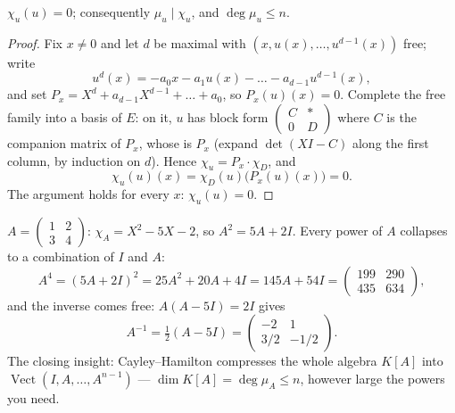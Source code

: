 \begin{theorem}\label{thm:b2:reduction:cayleyhamilton}
$\chi_u(u) = 0$; consequently $\mu_u \mid \chi_u$, and $\deg \mu_u
\leq n$.
\end{theorem}

\begin{proof}
Fix $x \neq 0$ and let $d$ be maximal with $(x, u(x), \dots,
u^{d-1}(x))$ free; write
\[
u^d(x) = -a_0 x - a_1 u(x) - \dots - a_{d-1}u^{d-1}(x),
\]
and set $P_x = X^d + a_{d-1}X^{d-1} + \dots + a_0$, so $P_x(u)(x) =
0$. Complete the free family into a basis of $E$: on it, $u$ has
block form $\begin{pmatrix} C & \ast\\ 0 & D\end{pmatrix}$ where $C$
is the companion matrix of $P_x$, whose  is
$P_x$ (expand $\det(XI - C)$ along the first column, by induction on
$d$). Hence $\chi_u = P_x \cdot \chi_D$, and
\[
\chi_u(u)(x) = \chi_D(u)\bigl(P_x(u)(x)\bigr) = 0 .
\]
The argument holds for every $x$: $\chi_u(u) = 0$.
\end{proof}

\begin{example}\label{ex:b2:reduction:chwork}
$A = \begin{pmatrix} 1 & 2\\ 3 & 4\end{pmatrix}$: $\chi_A = X^2 -
5X - 2$, so $A^2 = 5A + 2I$. Every power of $A$ collapses to a
combination of $I$ and $A$:
\[
A^4 = (5A + 2I)^2 = 25A^2 + 20A + 4I = 145A + 54I =
\begin{pmatrix} 199 & 290\\ 435 & 634\end{pmatrix},
\]
and the inverse comes free: $A(A - 5I) = 2I$ gives
\[
A^{-1} = \tfrac12(A - 5I)
= \begin{pmatrix} -2 & 1\\ 3/2 & -1/2\end{pmatrix}.
\]
The closing insight: Cayley--Hamilton compresses the whole algebra
$K[A]$ into $\operatorname{Vect}(I, A, \dots, A^{n-1})$ ---
$\dim K[A] = \deg\mu_A \leq n$, however large the powers you need.
\end{example}

